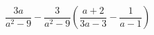\begin{ex}[type=expression]
	\begin{condition}
		\(\dfrac{3a}{a^2-9}-\dfrac{3}{a^2-9}\left( \dfrac{a+2}{3a-3}-\dfrac{1}{a-1} \right)\)
	\end{condition}
\end{ex}